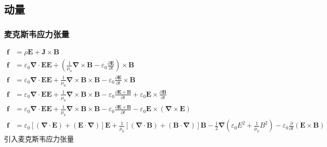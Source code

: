 \subsection{动量}
\subsubsection{麦克斯韦应力张量}
\begin{align*}
    \boldsymbol f&=\rho\boldsymbol{E}+\boldsymbol{J}\times\boldsymbol{B}\\
    \boldsymbol f&=\varepsilon_0\boldsymbol{\nabla}\cdot\boldsymbol{E}\boldsymbol{E}+\left(\frac{1}{\mu_0}\boldsymbol{\nabla}\times\boldsymbol{B}-\varepsilon_0\frac{\partial\boldsymbol{E}}{\partial t}\right)\times\boldsymbol{B}\\
    \boldsymbol f&=\varepsilon_0\boldsymbol{\nabla}\cdot\boldsymbol{E}\boldsymbol{E}+\frac{1}{\mu_0}\boldsymbol{\nabla}\times\boldsymbol{B}\times\boldsymbol{B}
    -\varepsilon_0\frac{\partial\boldsymbol{E}}{\partial t}\times\boldsymbol{B}\\
    \boldsymbol f&=\varepsilon_0\boldsymbol{\nabla}\cdot\boldsymbol{E}\boldsymbol{E}+\frac{1}{\mu_0}\boldsymbol{\nabla}\times\boldsymbol{B}\times\boldsymbol{B}
    -\varepsilon_0\frac{\partial\boldsymbol{E}\times\boldsymbol{B}}{\partial t}
    +\varepsilon_0\boldsymbol{E}\times\frac{\partial\boldsymbol{B}}{\partial t}\\
    \boldsymbol f&=\varepsilon_0\boldsymbol{\nabla}\cdot\boldsymbol{E}\boldsymbol{E}+\frac{1}{\mu_0}\boldsymbol{\nabla}\times\boldsymbol{B}\times\boldsymbol{B}
    -\varepsilon_0\frac{\partial\boldsymbol{E}\times\boldsymbol{B}}{\partial t}
    -\varepsilon_0\boldsymbol{E}\times\left(\boldsymbol{\nabla}\times\boldsymbol{E}\right)\\
    \boldsymbol f&=\varepsilon_0\left[\left(\boldsymbol{\nabla}\cdot\boldsymbol{E}\right)+\left(\boldsymbol{E}\cdot\boldsymbol{\nabla}\right)\right]\boldsymbol{E}
    +\frac{1}{\mu_0}\left[\left(\boldsymbol{\nabla}\cdot\boldsymbol{B}\right)+\left(\boldsymbol{B}\cdot\boldsymbol{\nabla}\right)\right]\boldsymbol{B}
    -\frac12\boldsymbol{\nabla}\left(\varepsilon_0E^2+\frac{1}{\mu_0}B^2\right)-\varepsilon_0\frac{\partial}{\partial t}(\boldsymbol{E}\times\boldsymbol{B})
\end{align*}
引入麦克斯韦应力张量

